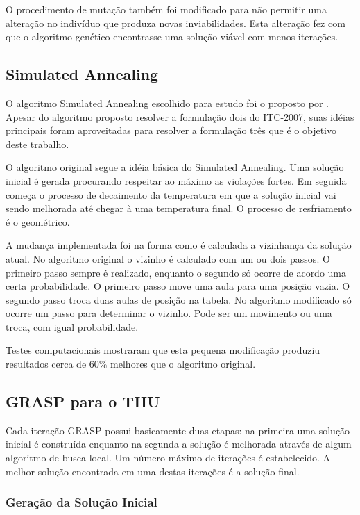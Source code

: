 \documentclass[11pt]{article}
\begin{document}
O procedimento de mutação também foi modificado para não permitir uma alteração no indivíduo que produza novas inviabilidades. Esta alteração fez com que o algoritmo genético encontrasse uma solução viável com menos iterações.

\subsection{Simulated Annealing}

O algoritmo Simulated Annealing escolhido para estudo foi o proposto por \cite{CDGS11b}. Apesar do algoritmo proposto resolver a formulação dois do ITC-2007, suas idéias principais foram aproveitadas para resolver a formulação três que é o objetivo deste trabalho.

O algoritmo original segue a idéia básica do Simulated Annealing. Uma solução inicial é gerada procurando respeitar ao máximo as violações fortes. Em seguida começa o processo de decaimento da temperatura em que a solução inicial vai sendo melhorada até chegar à uma temperatura final. O processo de resfriamento é o geométrico.

A mudança implementada foi na forma como é calculada a vizinhança da solução atual. No algoritmo original o vizinho é calculado com um ou dois passos. O primeiro passo sempre é realizado, enquanto o segundo só ocorre de acordo uma certa probabilidade. O primeiro passo move uma aula para uma posição vazia. O segundo passo troca duas aulas de posição na tabela. No algoritmo modificado só ocorre um passo para determinar o vizinho. Pode ser um movimento ou uma troca, com igual probabilidade.

Testes computacionais mostraram que esta pequena modificação produziu resultados cerca de $60\%$ melhores que o algoritmo original.

\subsection{GRASP para o THU}

Cada iteração GRASP \cite{grasp_resende_ribeiro} possui basicamente duas etapas: na primeira uma solução inicial é construída enquanto na segunda a solução é melhorada através de algum algoritmo de busca local. Um número máximo de iterações é estabelecido. A melhor solução encontrada em uma destas iterações é a solução final.

\subsubsection{Geração da Solução Inicial}
\end{document}
